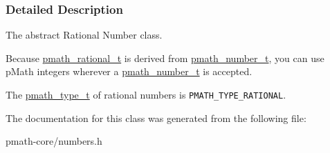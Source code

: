 \subsubsection{Detailed Description}
The abstract Rational Number class. 

Because \hyperlink{classpmath__rational__t}{pmath\_\-rational\_\-t} is derived from \hyperlink{classpmath__number__t}{pmath\_\-number\_\-t}, you can use pMath integers wherever a \hyperlink{classpmath__number__t}{pmath\_\-number\_\-t} is accepted.

The \hyperlink{group__objects_ge2646df76dcb0113715322b13a1f36f0}{pmath\_\-type\_\-t} of rational numbers is {\tt PMATH\_\-TYPE\_\-RATIONAL}. 

The documentation for this class was generated from the following file:\begin{CompactItemize}
\item 
pmath-core/numbers.h\end{CompactItemize}
